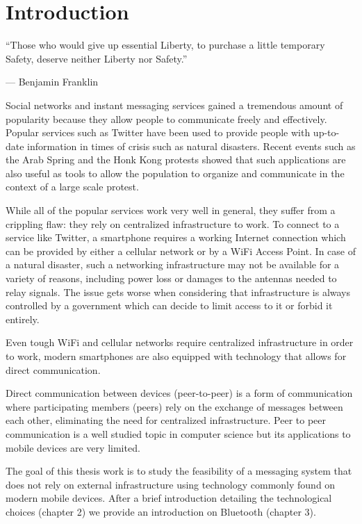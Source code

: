 \chapter{Introduction}

\epigraph{``Those who would give up essential Liberty, to purchase a little temporary Safety, deserve neither Liberty nor Safety.''}{--- \textup{Benjamin Franklin} }

Social networks and instant messaging services gained a tremendous amount of popularity because they allow people to communicate freely and effectively.
Popular services such as Twitter have been used to provide people with up-to-date information in times of crisis such as natural disasters.
Recent events such as the Arab Spring and the Honk Kong protests showed that such applications are also useful as tools to allow the population to organize and communicate in the context of a large scale protest.

While all of the popular services work very well in general, they suffer from a crippling flaw: they rely on centralized infrastructure to work.
To connect to a service like Twitter, a smartphone requires a working Internet connection which can be provided by either a cellular network or by a WiFi Access Point.
In case of a natural disaster, such a networking infrastructure may not be available for a variety of reasons, including power loss or damages to the antennas needed to relay signals.
The issue gets worse when considering that infrastructure is always controlled by a government which can decide to limit access to it or forbid it entirely.

Even tough WiFi and cellular networks require centralized infrastructure in order to work, modern smartphones are also equipped with technology that allows for direct communication.

Direct communication between devices (peer-to-peer) is a form of communication where participating members (peers) rely on the exchange of messages between each other, eliminating the need for centralized infrastructure.
Peer to peer communication is a well studied topic in computer science but its applications to mobile devices are very limited.

The goal of this thesis work is to study the feasibility of a messaging system that does not rely on external infrastructure using technology commonly found on modern mobile devices.
After a brief introduction detailing the technological choices (chapter 2) we provide an introduction on Bluetooth (chapter 3).

